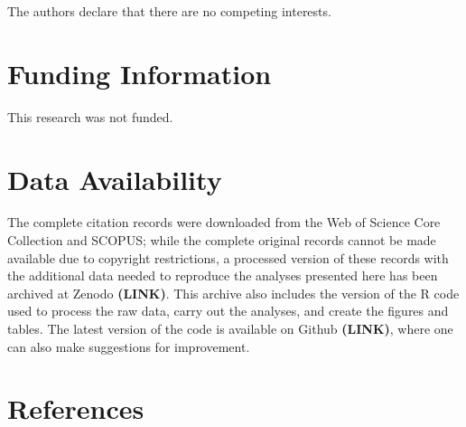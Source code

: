 \documentclass[
  english,
  man]{apa6}
\begin{document}
The authors declare that there are no competing interests.

\hypertarget{funding-information}{%
\section{Funding Information}\label{funding-information}}

This research was not funded.

\hypertarget{data-availability}{%
\section{Data Availability}\label{data-availability}}

The complete citation records were downloaded from the Web of Science Core Collection and SCOPUS; while the complete original records cannot be made available due to copyright restrictions, a processed version of these records with the additional data needed to reproduce the analyses presented here has been archived at Zenodo \textbf{(LINK)}. This archive also includes the version of the R code used to process the raw data, carry out the analyses, and create the figures and tables. The latest version of the code is available on Github \textbf{(LINK)}, where one can also make suggestions for improvement.

\newpage

\hypertarget{references}{%
\section{References}\label{references}}

\begingroup
\setlength{\parindent}{-0.5in}
\setlength{\leftskip}{0.5in}
\end{document}
